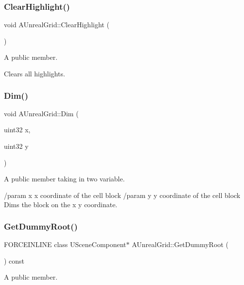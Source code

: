 \subsubsection{\texorpdfstring{Clear\+Highlight()}{ClearHighlight()}}
{\footnotesize\ttfamily void A\+Unreal\+Grid\+::\+Clear\+Highlight (\begin{DoxyParamCaption}{ }\end{DoxyParamCaption})}



A public member. 

Clears all highlights. \hypertarget{class_a_unreal_grid_a18fad8e1af79ff004c54c0a05b171f01}{}\label{class_a_unreal_grid_a18fad8e1af79ff004c54c0a05b171f01} 
\subsubsection{\texorpdfstring{Dim()}{Dim()}}
{\footnotesize\ttfamily void A\+Unreal\+Grid\+::\+Dim (\begin{DoxyParamCaption}\item[{uint32}]{x,  }\item[{uint32}]{y }\end{DoxyParamCaption})}



A public member taking in two variable. 

/param x x coordinate of the cell block /param y y coordinate of the cell block Dims the block on the x y coordinate. \hypertarget{class_a_unreal_grid_adc32753015f3681249c9effd0babf72d}{}\label{class_a_unreal_grid_adc32753015f3681249c9effd0babf72d} 
\subsubsection{\texorpdfstring{Get\+Dummy\+Root()}{GetDummyRoot()}}
{\footnotesize\ttfamily F\+O\+R\+C\+E\+I\+N\+L\+I\+NE class U\+Scene\+Component$\ast$ A\+Unreal\+Grid\+::\+Get\+Dummy\+Root (\begin{DoxyParamCaption}{ }\end{DoxyParamCaption}) const\hspace{0.3cm}{\ttfamily [inline]}}



A public member. 

